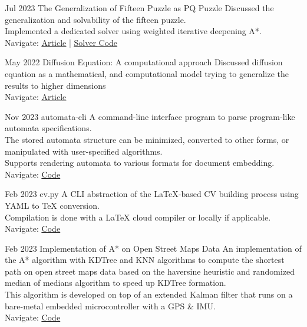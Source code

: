 \documentclass[hidelinks]{report}
\begin{document}
\vspace{2mm}


\entry
    {Jul 2023}
    {The Generalization of Fifteen Puzzle as PQ Puzzle}  
    {} {}
    {
      \textbullet Discussed the generalization and solvability of the fifteen puzzle.\\
      \textbullet Implemented a dedicated solver using weighted iterative deepening A*.\\
      \textbullet Navigate:  \href{\blog/fifteen-puzzle}{\underline{Article}} | 
      \href{\github/fifteen-puzzle-solver}{\underline{Solver Code}}
    } 


\entry
    {May 2022}
    {Diffusion Equation: A computational approach}  
    {} 
    {}
    {
        \textbullet Discussed diffusion equation as a mathematical, and computational
        model trying to generalize the results to higher dimensions \\
        \textbullet Navigate: \href{\blog/diffusion}{\underline{Article}}
    }

\vspace{2mm}



\entry
    {Nov 2023}
    {automata-cli}
    {} {}
    {
    \textbullet A command-line interface program to parse program-like automata specifications. \\ 
    \textbullet The stored automata structure can be minimized, converted to other forms, or 
    manipulated with user-specified algorithms. \\ 
    \textbullet Supports rendering automata to various formats for document embedding.\\
    \textbullet Navigate: \href{\github/automata-cli}{\underline{Code}}
    }

\entry
    {Feb 2023}
    {cv.py}
    {} {}  
    {
      \textbullet A CLI abstraction of the LaTeX-based CV building process using YAML to TeX conversion.\\
      \textbullet Compilation is done with a LaTeX cloud compiler or locally if applicable.
      \textbullet Navigate: \href{\github/CV.py}{\underline{Code}}
    }

\entry
    {Feb 2023}
    {Implementation of A* on Open Street Maps Data }
    {} {}    
    {
       \textbullet An implementation of the A* algorithm with KDTree and KNN algorithms to compute the shortest path on open street maps data based on the haversine heuristic and randomized median of medians algorithm to speed up KDTree formation.\\
       \textbullet This algorithm is developed on top of an extended Kalman filter that runs on a bare-metal embedded microcontroller with a GPS \& IMU. \\
       \textbullet Navigate: \href{\github/Astar-OSM}{\underline{Code}}
    }
\end{document}
